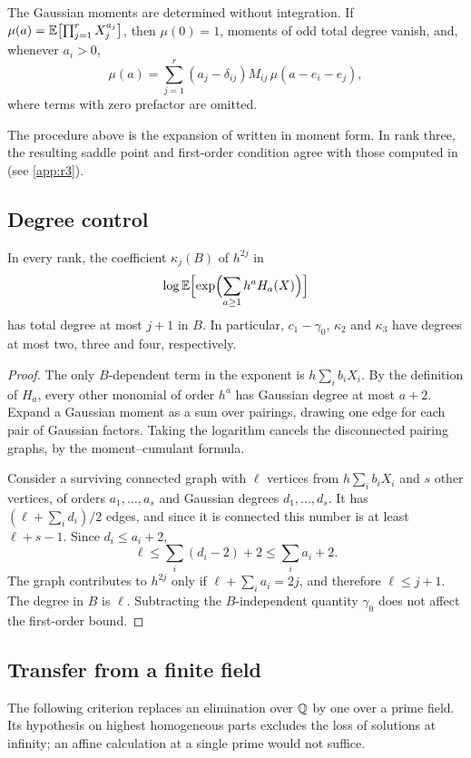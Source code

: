 The Gaussian moments are determined without integration. If $\mu(a)=\mathbb{E}\bigl[\prod_{j=1}^rX_j^{a_j}\bigr]$, then $\mu(0)=1$, moments of odd total degree vanish, and, whenever $a_i>0$,
\[
\mu(a)=\sum_{j=1}^r(a_j-\delta_{ij})M_{ij}\,\mu(a-e_i-e_j),
\]
where terms with zero prefactor are omitted.

\begin{remark}\label{rem:cusp-check}
The procedure above is the expansion of \cite[Theorem~2.3]{VZ11} written in moment form. In rank three, the resulting saddle point and first-order condition agree with those computed in \cite[Section~4.1]{MW24} (see \cref{app:r3}).
\end{remark}

\subsection{Degree control}

\begin{lemma}\label{lem:degree}
In every rank, the coefficient $\kappa_j(B)$ of $h^{2j}$ in
\[
\log\mathbb{E}\Bigl[\exp\Bigl(\sum_{a\ge1}h^aH_a(X)\Bigr)\Bigr]
\]
has total degree at most $j+1$ in $B$. In particular, $c_1-\gamma_0$, $\kappa_2$ and $\kappa_3$ have degrees at most two, three and four, respectively.
\end{lemma}

\begin{proof}
The only $B$-dependent term in the exponent is $h\sum_ib_iX_i$. By the definition of $H_a$, every other monomial of order $h^a$ has Gaussian degree at most $a+2$. Expand a Gaussian moment as a sum over pairings, drawing one edge for each pair of Gaussian factors. Taking the logarithm cancels the disconnected pairing graphs, by the moment--cumulant formula.

Consider a surviving connected graph with $\ell$ vertices from $h\sum_ib_iX_i$ and $s$ other vertices, of orders $a_1,\dots,a_s$ and Gaussian degrees $d_1,\dots,d_s$. It has $(\ell+\sum_id_i)/2$ edges, and since it is connected this number is at least $\ell+s-1$. Since $d_i\le a_i+2$,
\[
\ell\le\sum_i(d_i-2)+2\le\sum_ia_i+2.
\]
The graph contributes to $h^{2j}$ only if $\ell+\sum_ia_i=2j$, and therefore $\ell\le j+1$. The degree in $B$ is $\ell$. Subtracting the $B$-independent quantity $\gamma_0$ does not affect the first-order bound.
\end{proof}

\subsection{Transfer from a finite field}
The following criterion replaces an elimination over $\mathbb{Q}$ by one over a prime field. Its hypothesis on highest homogeneous parts excludes the loss of solutions at infinity; an affine calculation at a single prime would not suffice.

